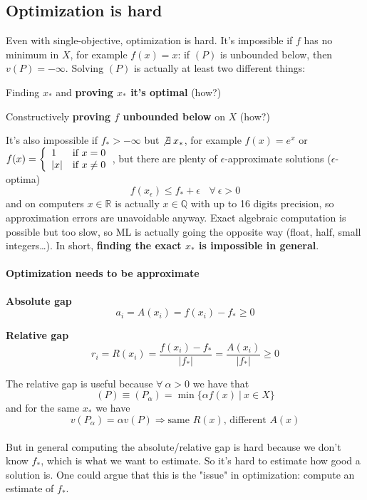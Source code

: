 \documentclass[10pt]{report}
\begin{document}
\subsection{Optimization is hard}
Even with single-objective, optimization is hard. It's impossible if $f$ has no minimum in $X$, for example $f(x) = x$: if $(P)$ is unbounded below, then $v(P) = -\infty$. Solving $(P)$ is actually at least two different things:
\begin{list}{}{}
	\item Finding $x_*$ and \textbf{proving $x_*$ it's optimal} (how?)
	\item Constructively \textbf{proving $f$ unbounded below} on $X$ (how?)
\end{list}
It's also impossible if $f_* > -\infty$ but $\not\exists\:x_*$, for example $f(x) = e^x$ or $f(x)=\left\{\begin{array}{l l}
1&\text{if }x = 0\\
|x|&\text{if }x \neq 0
\end{array}\right.$, but there are plenty of $\epsilon$-approximate solutions ($\epsilon$-optima) $$f(x_\epsilon)\leq f_* + \epsilon\:\:\:\:\forall\:\epsilon>0$$
and on computers $x\in \mathbb{R}$ is actually $x\in \mathbb{Q}$ with up to 16 digits precision, so approximation errors are unavoidable anyway. Exact algebraic computation is possible but too slow, so ML is actually going the opposite way (float, half, small integers\ldots). In short, \textbf{finding the exact $x_*$ is impossible in general}.
\paragraph{Optimization needs to be approximate} \begin{list}{}{}
	\item \textbf{Absolute gap} $$a_i = A(x_i) = f(x_i) - f_* \geq 0$$
	\item \textbf{Relative gap} $$r_i = R(x_i) = \frac{f(x_i) - f_*}{|f_*|} = \frac{A(x_i)}{|f_*|}\geq 0$$
\end{list}
The relative gap is useful because $\forall\:\alpha>0$ we have that $$(P)\equiv (P_\alpha) = \min\{\alpha f(x)\:|\:x\in X\}$$ and for the same $x_*$ we have $$v(P_\alpha) = \alpha v(P) \Rightarrow\text{same }R(x)\text{, different }A(x)$$\\
But in general computing the absolute/relative gap is hard because we don't know $f_*$, which is what we want to estimate. So it's hard to estimate how good a solution is. One could argue that this is the "issue" in optimization: compute an estimate of $f_*$.
\end{document}
